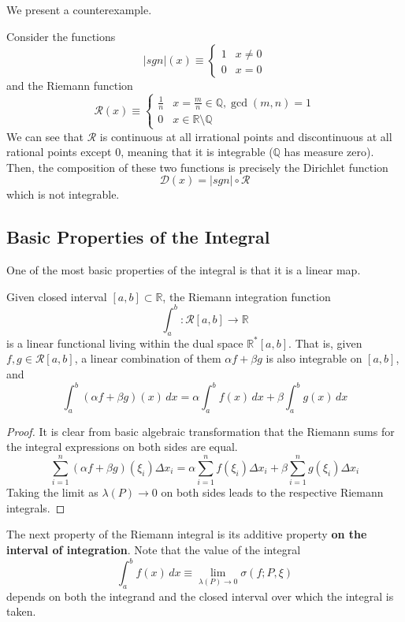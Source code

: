   We present a counterexample. 
  \begin{example}
  Consider the functions
  \[|sgn|(x) \equiv \begin{cases}
  1 & x \neq 0 \\
  0 & x = 0
  \end{cases}\]
  and the Riemann function 
  \[\mathcal{R}(x) \equiv \begin{cases}
  \frac{1}{n} & x = \frac{m}{n} \in \mathbb{Q}, \gcd(m, n) = 1 \\
  0 & x \in \mathbb{R} \setminus \mathbb{Q}
  \end{cases}\]
  We can see that $\mathcal{R}$ is continuous at all irrational points and discontinuous at all rational points except $0$, meaning that it is integrable ($\mathbb{Q}$ has measure zero). Then, the composition of these two functions is precisely the Dirichlet function
  \[\mathcal{D}(x) = |sgn| \circ \mathcal{R}\]
  which is not integrable. 
  \end{example}

\subsection{Basic Properties of the Integral}

  One of the most basic properties of the integral is that it is a linear map. 
  \begin{lemma}
    Given closed interval $[a, b] \subset \mathbb{R}$, the Riemann integration function 
    \[\int_a^b: \mathcal{R}[a, b] \longrightarrow \mathbb{R}\]
    is a linear functional living within the dual space $\mathbb{R}^* [a, b]$. That is, given $f, g \in \mathcal{R}[a, b]$, a linear combination of them $\alpha f + \beta g$ is also integrable on $[a,b]$, and 
    \[\int_a^b (\alpha f + \beta g)(x)\,dx = \alpha \int_a^b f(x)\,dx + \beta \int_a^b g(x)\,dx\]
  \end{lemma}
  \begin{proof}
  It is clear from basic algebraic transformation that the Riemann sums for the integral expressions on both sides are equal. 
  \[\sum_{i=1}^n (\alpha f + \beta g) (\xi_i) \Delta x_i = \alpha \sum_{i=1}^n f(\xi_i) \Delta x_i + \beta \sum_{i=1}^n g(\xi_i) \Delta x_i\]
  Taking the limit as $\lambda(P) \rightarrow 0$ on both sides leads to the respective Riemann integrals. 
  \end{proof}


  The next property of the Riemann integral is its additive property \textbf{on the interval of integration}. Note that the value of the integral 
  \[\int_a^b f(x) \,dx \equiv \lim_{\lambda(P) \rightarrow 0} \sigma(f; P, \xi)\]
  depends on both the integrand and the closed interval over which the integral is taken. 


